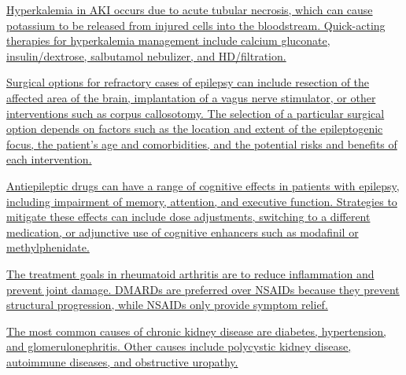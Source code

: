 \documentclass[10pt, a4paper]{article}
\begin{document}
\begin{multicols}{2}
\begin{enumerate}
 \vspace{6pt} 

\parbox{\linewidth}{\item \href{https://www.notion.so/Acute-Kidney-Injury-e1ac3aaece0e41b8b6f264aed159df07}{ Hyperkalemia in AKI occurs due to acute tubular necrosis, which can cause potassium to be released from injured cells into the bloodstream. Quick-acting therapies for hyperkalemia management include calcium gluconate, insulin/dextrose, salbutamol nebulizer, and HD/filtration.}} 

 \vspace{6pt} 

\parbox{\linewidth}{\item \href{https://www.notion.so/Epilepsy-885811c6268d4c05b5dacd9541850a0f}{ Surgical options for refractory cases of epilepsy can include resection of the affected area of the brain, implantation of a vagus nerve stimulator, or other interventions such as corpus callosotomy. The selection of a particular surgical option depends on factors such as the location and extent of the epileptogenic focus, the patient's age and comorbidities, and the potential risks and benefits of each intervention.}} 

 \vspace{6pt} 

\parbox{\linewidth}{\item \href{https://www.notion.so/Epilepsy-885811c6268d4c05b5dacd9541850a0f}{ Antiepileptic drugs can have a range of cognitive effects in patients with epilepsy, including impairment of memory, attention, and executive function. Strategies to mitigate these effects can include dose adjustments, switching to a different medication, or adjunctive use of cognitive enhancers such as modafinil or methylphenidate.}} 

 \vspace{6pt} 

\parbox{\linewidth}{\item \href{https://www.notion.so/Rheumatoid-Arthritis-6a0cf88ae3804bf28deb902f66fcfa47}{ The treatment goals in rheumatoid arthritis are to reduce inflammation and prevent joint damage. DMARDs are preferred over NSAIDs because they prevent structural progression, while NSAIDs only provide symptom relief.}} 

 \vspace{6pt} 

\parbox{\linewidth}{\item \href{https://www.notion.so/Clinical-Pathology-Chronic-Kidney-Disease-60fba6f300a94462bae85f347433d15b}{ The most common causes of chronic kidney disease are diabetes, hypertension, and glomerulonephritis. Other causes include polycystic kidney disease, autoimmune diseases, and obstructive uropathy.}} 


\end{enumerate}
\end{multicols}
\end{document}
